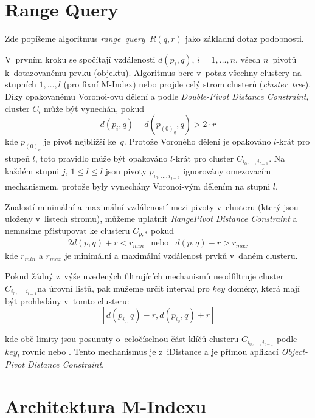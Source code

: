 \section{Range Query\label{sec:Range-Query}}

Zde popíšeme algoritmus \emph{range~query~}$R(q,r)$ jako základní
dotaz podobnosti.

V~prvním kroku se spočítají vzdálenosti $d(p_{i},q),\, i=1,\ldots,n$,
všech $n$~pivotů k~dotazovanému prvku (objektu)\@. Algoritmus
bere v~potaz všechny clustery na stupních $1,\ldots,l$ (pro fixní
M-Index) nebo projde celý strom clusterů (\emph{cluster~tree})\@.
Díky opakovanému Voronoi-ovu dělení a podle \emph{Double-Pivot Distance
Constraint}\cite{similaritysearch2006}, cluster $C_{i}$ může být
vynechán, pokud
\[
d(p_{i},q)-d(p_{(0)_{q}},q)>2\cdot r
\]
kde $p_{(0)_{q}}$ je pivot nejbližší ke~$q$\@. Protože Voroného
dělení je opakováno $l$-krát pro stupeň $l$, toto pravidlo může
být opakováno $l$-krát pro cluster $C_{i_{0},\ldots,i_{l-1}}$\@.
Na každém stupni $j,\,1\leq l\leq l$ jsou pivoty $p_{i_{0},\ldots,i_{j-2}}$
ignorovány omezovacím mechanismem, protože byly vynechány Voronoi-vým
dělením na stupni $l$\@.

Znalostí minimální a maximální vzdáleností mezi pivoty v~clusteru
(který jsou uloženy v~listech stromu), můžeme uplatnit \emph{RangePivot
Distance Constraint}\cite{similaritysearch2006} a nemusíme přistupovat
ke clusteru $C_{p,*}$ pokud
\begin{alignat*}{2}
d(p,q)+r<r_{min} & \textrm{nebo} & d(p,q)-r>r_{max}
\end{alignat*}
kde $r_{min}$ a $r_{max}$ je minimální a maximální vzdálenost prvků
v~daném clusteru\@.

Pokud žádný z~výše uvedených filtrujících mechanismů neodfiltruje
cluster $C_{i_{0},\ldots,i_{l-1}}$na úrovní listů, pak můžeme určit
interval pro $key$ domény, která mají být prohledány v~tomto clusteru:
\[
[d(p_{i_{0},}q)-r,d(p_{i_{0}},q)+r]
\]

kde obě limity jsou posunuty o~celočíselnou část klíčů clusteru $C_{i_{0},\ldots,i_{l-1}}$ podle
$key_{l}$ rovnic  nebo .
Tento mechanismus je  \linebreak z~iDistance a je přímou aplikací
\emph{Object-Pivot Distance Constraint}\cite{similaritysearch2006}\@.

\section{Architektura M-Indexu}

